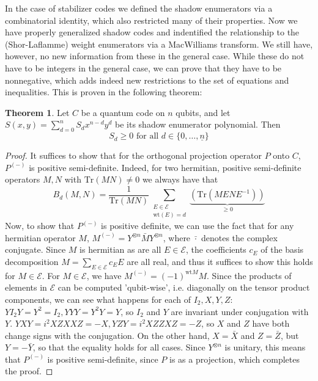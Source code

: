 \documentclass{article}
\def\E{\mathcal{E}}
\def\n{\underline{n}}
\def\fa{\text{ for all }}
\def\Tr{\text{Tr}}
\def\wt{\text{wt}}
\theoremstyle{definition}
\newtheorem{theorem}[Satz]{Theorem}
\begin{document}
In the case of stabilizer codes we defined the shadow enumerators via a combinatorial identity, which also restricted many of their properties.
Now we have properly generalized shadow codes and indentified the relationship to the (Shor-Laflamme) weight enumerators via a MacWilliams transform. We still have, however, no new information from these in the general case. 
While these do not have to be integers in the general case, we can prove that they have to be nonnegative, which adds indeed new restrictions to the set of equations and inequalities. This is proven in the following theorem:

\begin{theorem}\label{shadowgeq0}
Let $C$ be a quantum code on $n$ qubits, and let $S(x,y)= \sum_{d=0}^n S_d x^{n-d} y^d $ be its shadow enumerator polynomial. Then \begin{equation} S_d \geq 0 \fa d \in \{0, \ldots, \n \} \end{equation}
\begin{proof}
It suffices to show that for the orthogonal projection operator $P$ onto $C$, $P^{(-)}$ is positive semi-definite. Indeed, for two hermitian, positive semi-definite operators $M,N$ with $\Tr(MN) \neq 0$ we always have that
\begin{equation} B_d(M,N) = \frac{1}{\Tr(M N)} \sum_{\substack{E \in \mathcal{E} \\ \wt(E) = d}} \underbrace{(\Tr(M E N E^{-1}))}_{\geq 0} \end{equation}
Now, to show that $P^{(-)}$ is positive definite, we can use the fact that for any hermitian operator $M$,  $M^{(-)} = Y^{\otimes n} \bar M Y^{\otimes n}$, where $\bar \cdot$ denotes the complex conjugate.
Since $M$ is hermitian as are all $E \in \E$, the coefficients $c_E$ of the basis decomposition $M = \sum_{E \in \E} c_E E$ are all real, and thus it suffices to show this holds for $M \in \E$.
For $M \in \E$, we have $ M^{(-)} = (-1)^{\wt M} M$. Since the products of elements in $\E$ can be computed 'qubit-wise', i.e. diagonally on the tensor product components, we can see what happens for each of $I_2, X, Y, Z$:
$YI_2Y = Y^2 = I_2, YYY = Y^2 Y = Y$, so $I_2$ and $Y$ are invariant under conjugation with $Y$. $YXY = i^2 XZXXZ = -X, YZY = i^2 XZZXZ = -Z$, so $X$ and $Z$ have both change signs with the conjugation. 
On the other hand, $X = \bar X$ and $Z = \bar Z$, but $Y = - \bar Y$, so that the equality holds for all cases. Since $Y^{\otimes n}$ is unitary, this means that $P^{(-)}$ is positive semi-definite, since $P$ is as a projection, which completes the proof.
\end{proof}
\end{theorem}
\end{document}

